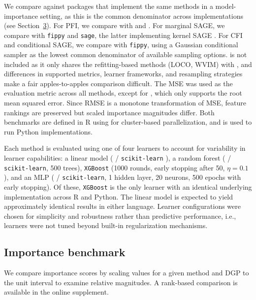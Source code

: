 We compare against packages that implement the same methods in a model-importance setting, as this is the common denominator across implementations (see Section~\hyperref[sec-related]{3}).
For PFI, we compare with  and .
For marginal SAGE, we compare with \texttt{fippy} and \texttt{sage}, the latter implementing kernel SAGE \citep{covert2021improvingkernelshap}.
For CFI and conditional SAGE, we compare with \texttt{fippy}, using a Gaussian conditional sampler as the lowest common denominator of available sampling options.
 is not included as it only shares the refitting-based methods (LOCO, WVIM) with , and differences in supported metrics, learner frameworks, and resampling strategies make a fair apples-to-apples comparison difficult.
The MSE was used as the evaluation metric across all methods, except for , which only supports the root mean squared error.
Since RMSE is a monotone transformation of MSE, feature rankings are preserved but scaled importance magnitudes differ.
Both benchmarks are defined in R using  \citep{lang2017batchtoolstools} for cluster-based parallelization, and  is used to run Python implementations.

Each method is evaluated using one of four learners to account for variability in learner capabilities: a linear model ( / \texttt{scikit-learn} \citep{scikitlearn2011}), a random forest ( / \texttt{scikit-learn}, 500 trees), \texttt{XGBoost} \citep{chen2016xgboostscalable} (1000 rounds, early stopping after 50, \(\eta = 0.1\)), and an MLP ( / \texttt{scikit-learn}, 1 hidden layer, 20 neurons, 500 epochs with early stopping).
Of these, \texttt{XGBoost} is the only learner with an identical underlying implementation across R and Python.
The linear model is expected to yield approximately identical results in either language.
Learner configurations were chosen for simplicity and robustness rather than predictive performance, i.e., learners were not tuned beyond built-in regularization mechanisms.

\subsection{Importance benchmark}\label{importance-benchmark}

We compare importance scores by scaling values for a given method and DGP to the unit interval to examine relative magnitudes.
A rank-based comparison is available in the online supplement.

